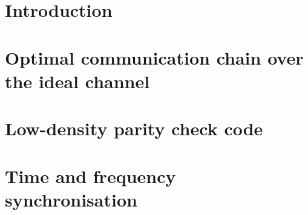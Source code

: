 \documentclass[12pt,english]{article}
\begin{document}
\cleardoublepage
{}


\tableofcontents

\newpage
\cleardoublepage
{}

\section{Introduction}


\section{Optimal communication chain over the ideal channel}\label{sec:step1}


\section{Low-density parity check code}


\section{Time and frequency synchronisation}

\end{document}
